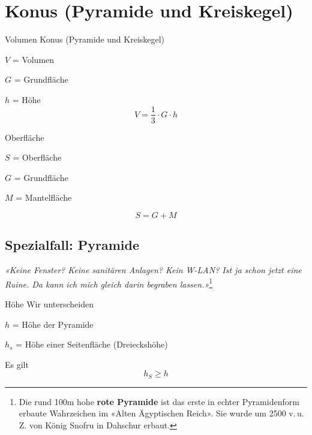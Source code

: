\section{Konus (Pyramide und Kreiskegel)}



\begin{gesetz}{Volumen Konus (Pyramide und Kreiskegel)}{}
  
  $V$ = Volumen
  
  $G$ = Grundfläche

  $h$ = Höhe
  $$V = \frac13\cdot{}G\cdot{}h$$
\end{gesetz}

\begin{gesetz}{Oberfläche}{}

  $S$ = Oberfläche

  $G$ = Grundfläche

  $M$ = Mantelfläche

  $$S = G + M$$
  \end{gesetz}
\newpage

\subsection{Spezialfall: Pyramide}


\begin{center}
{\textit{«Keine Fenster? Keine sanitären Anlagen? Kein W-LAN? Ist ja schon
jetzt eine Ruine. Da kann ich mich gleich darin begraben
lassen.»}}\footnote{Die rund 100m hohe \textbf{rote Pyramide} ist das
  erste in echter Pyramidenform erbaute Wahrzeichen im «Alten
  Ägyptischen Reich». Sie wurde um 2500 v.\,u.\,Z. von König Snofru in
Dahschur erbaut.}
\end{center}


\begin{bemerkung}{Höhe}{}
  Wir unterscheiden

  $h$ = Höhe der Pyramide

  $h_s$ = Höhe einer Seitenfläche (Dreieckshöhe)
\end{bemerkung}
\begin{gesetz}{}{}
  Es gilt
  $$h_S \ge h$$
  \end{gesetz}
\newpage
